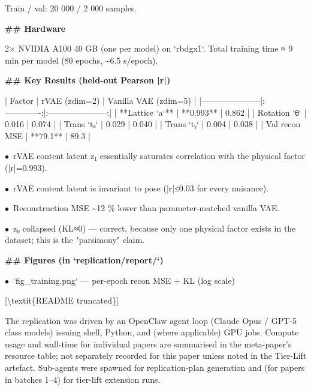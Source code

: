 \documentclass[11pt]{article}
\begin{document}
Train / val: 20 000 / 2 000 samples.

\par\medskip\textbf{\#\# Hardware}\par
2× NVIDIA A100 40 GB (one per model) on `rbdgx1`. Total training time
≈ 9 min per model (80 epochs, \textasciitilde{}6.5 s/epoch).

\par\medskip\textbf{\#\# Key Results (held-out Pearson |r|)}\par

| Factor              | rVAE (zdim=2) | Vanilla VAE (zdim=5) |
|---------------------|:-------------:|:---------------------:|
| **Lattice `a`**     | **0.993**     | 0.862                 |
| Rotation `θ`        | 0.016         | 0.074                 |
| Trans `tₓ`          | 0.029         | 0.040                 |
| Trans `tᵧ`          | 0.004         | 0.038                 |
| Val recon MSE       | **79.1**      | 89.3                  |
\par$\bullet$\ rVAE content latent z₁ essentially saturates correlation with the
  physical factor (|r|=0.993).
\par$\bullet$\ rVAE content latent is invariant to pose (|r|≤0.03 for every nuisance).
\par$\bullet$\ Reconstruction MSE \textasciitilde{}12 \% lower than parameter-matched vanilla VAE.
\par$\bullet$\ z₀ collapsed (KL≈0) — correct, because only one physical factor
  exists in the dataset; this is the "parsimony" claim.

\par\medskip\textbf{\#\# Figures (in `replication/report/`)}\par
\par$\bullet$\ `fig\_training.png` — per-epoch recon MSE + KL (log scale)

[\textbackslash{}textit\{README truncated\}]
\normalsize

The replication was driven by an OpenClaw agent loop (Claude Opus / GPT-5 class models) issuing shell, Python, and (where applicable) GPU jobs. Compute usage and wall-time for individual papers are summarised in the meta-paper's resource table; not separately recorded for this paper unless noted in the Tier-Lift artefact. Sub-agents were spawned for replication-plan generation and (for papers in batches 1--4) for tier-lift extension runs.
\end{document}
